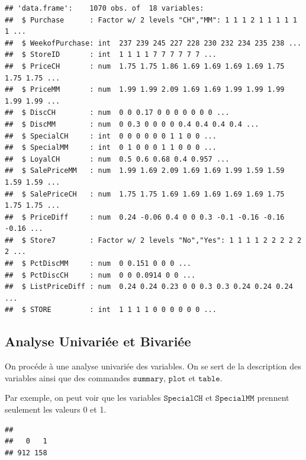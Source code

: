 \documentclass[
]{article}
\newenvironment{Shaded}{\begin{snugshade}}{\end{snugshade}}
\newcommand{\KeywordTok}[1]{\textcolor[rgb]{0.13,0.29,0.53}{\textbf{#1}}}
\newcommand{\NormalTok}[1]{#1}
\newcommand{\OperatorTok}[1]{\textcolor[rgb]{0.81,0.36,0.00}{\textbf{#1}}}
\begin{document}
\begin{verbatim}
## 'data.frame':    1070 obs. of  18 variables:
##  $ Purchase      : Factor w/ 2 levels "CH","MM": 1 1 1 2 1 1 1 1 1 1 ...
##  $ WeekofPurchase: int  237 239 245 227 228 230 232 234 235 238 ...
##  $ StoreID       : int  1 1 1 1 7 7 7 7 7 7 ...
##  $ PriceCH       : num  1.75 1.75 1.86 1.69 1.69 1.69 1.69 1.75 1.75 1.75 ...
##  $ PriceMM       : num  1.99 1.99 2.09 1.69 1.69 1.99 1.99 1.99 1.99 1.99 ...
##  $ DiscCH        : num  0 0 0.17 0 0 0 0 0 0 0 ...
##  $ DiscMM        : num  0 0.3 0 0 0 0 0.4 0.4 0.4 0.4 ...
##  $ SpecialCH     : int  0 0 0 0 0 0 1 1 0 0 ...
##  $ SpecialMM     : int  0 1 0 0 0 1 1 0 0 0 ...
##  $ LoyalCH       : num  0.5 0.6 0.68 0.4 0.957 ...
##  $ SalePriceMM   : num  1.99 1.69 2.09 1.69 1.69 1.99 1.59 1.59 1.59 1.59 ...
##  $ SalePriceCH   : num  1.75 1.75 1.69 1.69 1.69 1.69 1.69 1.75 1.75 1.75 ...
##  $ PriceDiff     : num  0.24 -0.06 0.4 0 0 0.3 -0.1 -0.16 -0.16 -0.16 ...
##  $ Store7        : Factor w/ 2 levels "No","Yes": 1 1 1 1 2 2 2 2 2 2 ...
##  $ PctDiscMM     : num  0 0.151 0 0 0 ...
##  $ PctDiscCH     : num  0 0 0.0914 0 0 ...
##  $ ListPriceDiff : num  0.24 0.24 0.23 0 0 0.3 0.3 0.24 0.24 0.24 ...
##  $ STORE         : int  1 1 1 1 0 0 0 0 0 0 ...
\end{verbatim}

\hypertarget{analyse-univariuxe9e-et-bivariuxe9e}{%
\subsection{Analyse Univariée et
Bivariée}\label{analyse-univariuxe9e-et-bivariuxe9e}}

On procéde à une analyse univariée des variables. On se sert de la
description des variables ainsi que des commandes \(\texttt{summary}\),
\(\texttt{plot}\) et \(\texttt{table}\).

Par exemple, on peut voir que les variables \(\texttt{SpecialCH}\) et
\(\texttt{SpecialMM}\) prennent seulement les valeurs 0 et 1.

\begin{Shaded}
\end{Shaded}

\begin{verbatim}
## 
##   0   1 
## 912 158
\end{verbatim}
\end{document}
